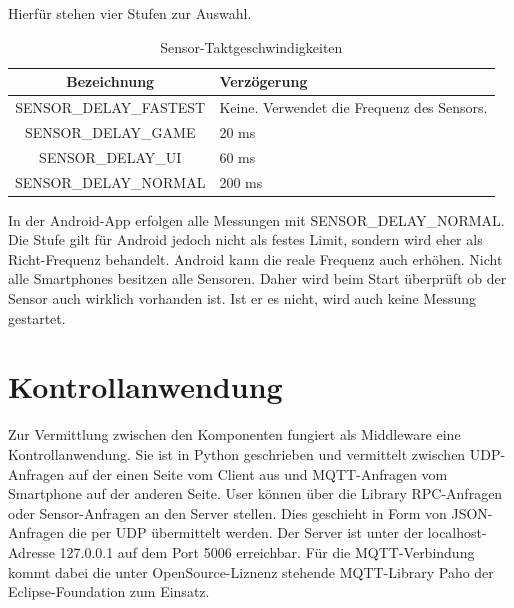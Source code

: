 \documentclass[11pt,a4paper]{report}
\begin{document}
Hierfür stehen vier Stufen zur Auswahl.
\begin{table}[htbp]
  \centering
  \begin{tabular}{|c|p{4cm}|}
      \hline
      \textbf{Bezeichnung} & \textbf{Verzögerung} \\
	  \hline
      SENSOR\_DELAY\_FASTEST & Keine. Verwendet die Frequenz des Sensors.\\
      \hline
      SENSOR\_DELAY\_GAME & 20 ms\\
      \hline
      SENSOR\_DELAY\_UI & 60 ms\\
      \hline
      SENSOR\_DELAY\_NORMAL & 200 ms\\
      \hline
  \end{tabular}
  \caption{Sensor-Taktgeschwindigkeiten\cite{sensor-takt}}
  \label{tab:sensor_speeds}
\end{table}
In der Android-App erfolgen alle Messungen mit SENSOR\_DELAY\_NORMAL.
Die Stufe gilt für Android jedoch nicht als festes Limit, sondern wird eher als Richt-Frequenz behandelt.
Android kann die reale Frequenz auch erhöhen.
Nicht alle Smartphones besitzen alle Sensoren.
Daher wird beim Start überprüft ob der Sensor auch wirklich vorhanden ist.
Ist er es nicht, wird auch keine Messung gestartet.

\chapter{Kontrollanwendung}\label{chap:server_software}
Zur Vermittlung zwischen den Komponenten fungiert als Middleware eine Kontrollanwendung.
Sie ist in Python geschrieben und vermittelt zwischen UDP-Anfragen auf der einen Seite vom Client aus und MQTT-Anfragen vom Smartphone auf der anderen Seite.
User können über die Library RPC-Anfragen oder Sensor-Anfragen an den Server stellen.
Dies geschieht in Form von JSON-Anfragen die per UDP übermittelt werden.
Der Server ist unter der localhost-Adresse 127.0.0.1 auf dem Port 5006 erreichbar.
Für die MQTT-Verbindung kommt dabei die unter OpenSource-Liznenz stehende MQTT-Library Paho \cite{paho} der Eclipse-Foundation zum Einsatz. 
\end{document}
